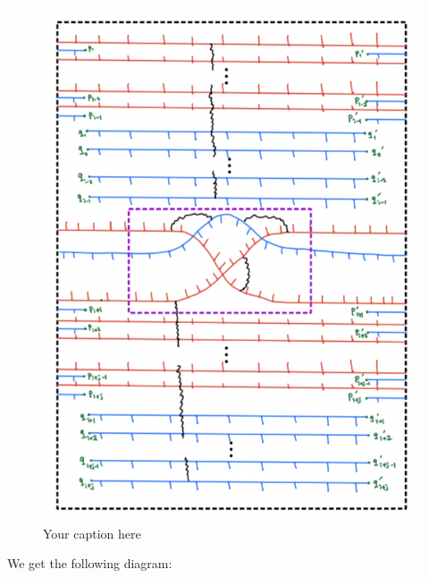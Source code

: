 \begin{figure}[H] %
    \centering
    \includegraphics[width=\linewidth]{diagrams/theorem12/11.png} %
    \caption{Your caption here}
    \label{fig:your-label}
\end{figure}

We get the following diagram:

